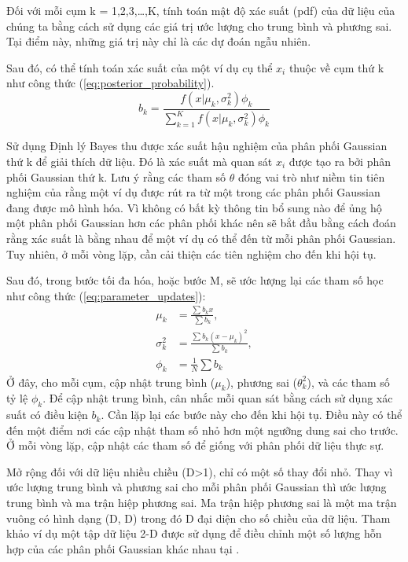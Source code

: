 \documentclass[a4paper]{article}
\begin{document}
Đối với mỗi cụm k = 1,2,3,…,K, tính toán mật độ xác suất (pdf) của dữ liệu của chúng ta bằng cách sử dụng các giá trị ước lượng cho trung bình và phương sai. Tại điểm này, những giá trị này chỉ là các dự đoán ngẫu nhiên.

Sau đó, có thể tính toán xác suất của một ví dụ cụ thể $x_i$ thuộc về cụm thứ k như công thức (\ref{eq:posterior_probability}).
\begin{equation}
    b_k = \frac{f(x|\mu_k, \sigma_k^2) \phi_k}{\sum_{k=1}^K f(x|\mu_k, \sigma_k^2) \phi_k}
    \label{eq:posterior_probability}
\end{equation}

Sử dụng Định lý Bayes thu được xác suất hậu nghiệm của phân phối Gaussian thứ k để giải thích dữ liệu. Đó là xác suất mà quan sát $x_i$ được tạo ra bởi phân phối Gaussian thứ k. Lưu ý rằng các tham số $\theta$ đóng vai trò như niềm tin tiên nghiệm của rằng một ví dụ được rút ra từ một trong các phân phối Gaussian đang được mô hình hóa. Vì không có bất kỳ thông tin bổ sung nào để ủng hộ một phân phối Gaussian hơn các phân phối khác nên sẽ bắt đầu bằng cách đoán rằng xác suất là bằng nhau để một ví dụ có thể đến từ mỗi phân phối Gaussian. Tuy nhiên, ở mỗi vòng lặp, cần cải thiện các tiên nghiệm cho đến khi hội tụ.

Sau đó, trong bước tối đa hóa, hoặc bước M, sẽ ước lượng lại các tham số học như công thức (\ref{eq:parameter_updates}):
\begin{equation}
    \begin{aligned}
        \mu_k &= \frac{\sum b_k x}{\sum b_k}, \\
        \sigma_k^2 &= \frac{\sum b_k (x - \mu_k)^2}{\sum b_k}, \\
        \phi_k &= \frac{1}{N} \sum b_k
    \end{aligned}
    \label{eq:parameter_updates}
\end{equation}
Ở đây, cho mỗi cụm, cập nhật trung bình ($\mu_k$), phương sai ($\theta_k^2$), và các tham số tỷ lệ $\phi_k$. Để cập nhật trung bình, cân nhắc mỗi quan sát bằng cách sử dụng xác suất có điều kiện $b_k$.
Cần lặp lại các bước này cho đến khi hội tụ. Điều này có thể đến một điểm nơi các cập nhật tham số nhỏ hơn một ngưỡng dung sai cho trước. Ở mỗi vòng lặp, cập nhật các tham số để giống với phân phối dữ liệu thực sự.

Mở rộng đối với dữ liệu nhiều chiều (D>1), chỉ có một số thay đổi nhỏ. Thay vì ước lượng trung bình và phương sai cho mỗi phân phối Gaussian thì ước lượng trung bình và ma trận hiệp phương sai. Ma trận hiệp phương sai là một ma trận vuông có hình dạng (D, D) trong đó D đại diện cho số chiều của dữ liệu. Tham khảo ví dụ một tập dữ liệu 2-D được sử dụng để điều chỉnh một số lượng hỗn hợp của các phân phối Gaussian khác nhau tại \cite{gaussian_mixture_python}.
\end{document}
